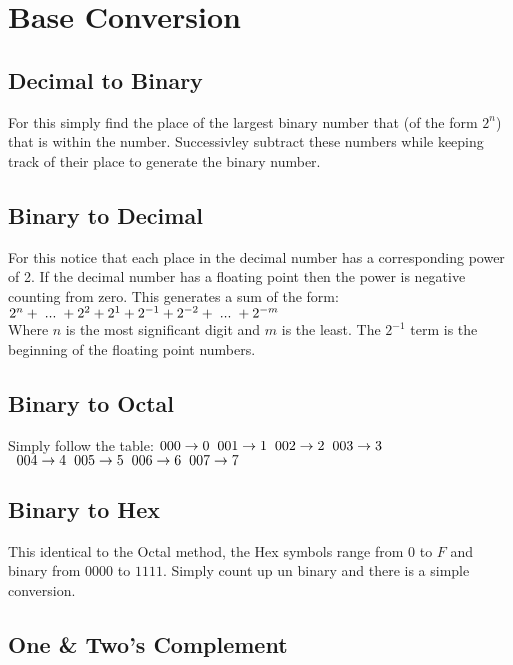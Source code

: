 \section{Base Conversion}
\subsection*{Decimal to Binary}
For this simply find the place of the largest binary number that (of the form $2^n$)
that is within the number. Successivley subtract these numbers while keeping track of their
place to generate the binary number.

\subsection*{Binary to Decimal}
For this notice that each place in the decimal number has a
corresponding power of 2. If the decimal number has a floating
point then the power is negative counting from zero. This generates a
sum of the form:\\
$ 2^{n} + \hspace{1mm} ... \hspace{1mm} + 2^2 + 2^1 + 2^{-1} + 2^{-2} + \hspace{1mm} ... \hspace{1mm} + 2^{-m} $\\
Where $n$ is the most significant digit and $m$ is the least. The $2^{-1}$ term
is the beginning of the floating point numbers.

\subsection*{Binary to Octal}
Simply follow the table:
$ 000 \rightarrow 0 \hspace{2mm} 001 \rightarrow 1 \hspace{2mm} 002 \rightarrow 2 \hspace{2mm} 003 \rightarrow 3 $
$ \hspace{2mm} 004 \rightarrow 4 \hspace{2mm} 005 \rightarrow 5 \hspace{2mm} 006 \rightarrow 6 \hspace{2mm} 007 \rightarrow 7 $\\

\subsection*{Binary to Hex}
This identical to the Octal method, the Hex symbols range from $0$ to $F$ and binary
from $0000$ to $1111$. Simply count up un binary and there is a simple conversion.

\subsection*{One \& Two's Complement}
